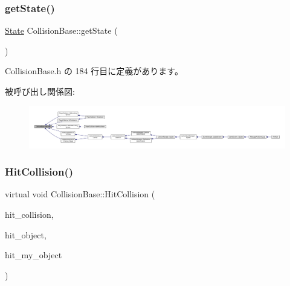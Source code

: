 \subsubsection{\texorpdfstring{get\+State()}{getState()}}
{\footnotesize\ttfamily \mbox{\hyperlink{class_collision_base_a4dd1ed00099a19c0176913af93c4e365}{State}} Collision\+Base\+::get\+State (\begin{DoxyParamCaption}{ }\end{DoxyParamCaption})\hspace{0.3cm}{\ttfamily [inline]}}



 Collision\+Base.\+h の 184 行目に定義があります。

被呼び出し関係図\+:
\nopagebreak
\begin{figure}[H]
\begin{center}
\leavevmode
\includegraphics[width=350pt]{class_collision_base_af4e773951a4e1965e64410841a0292a4_icgraph}
\end{center}
\end{figure}
\mbox{\label{class_collision_base_a5c94fe03f875595758e83eb2a176e45d}} 
\subsubsection{\texorpdfstring{Hit\+Collision()}{HitCollision()}}
{\footnotesize\ttfamily virtual void Collision\+Base\+::\+Hit\+Collision (\begin{DoxyParamCaption}\item[{\mbox{\hyperlink{class_collision_base}{Collision\+Base}} $\ast$}]{hit\+\_\+collision,  }\item[{\mbox{\hyperlink{class_collision_object}{Collision\+Object}} $\ast$}]{hit\+\_\+object,  }\item[{\mbox{\hyperlink{class_collision_object}{Collision\+Object}} $\ast$}]{hit\+\_\+my\+\_\+object }\end{DoxyParamCaption})\hspace{0.3cm}{\ttfamily [pure virtual]}}



